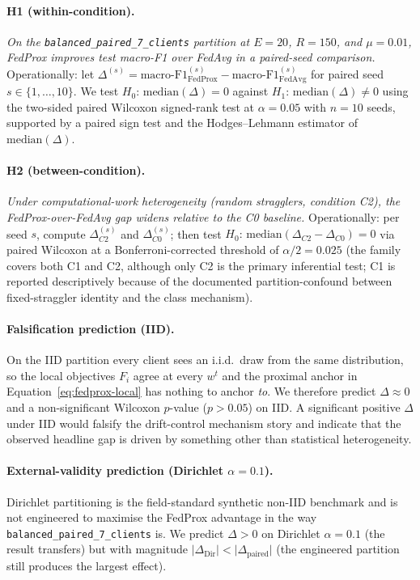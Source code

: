 \documentclass[11pt,a4paper]{article}
\begin{document}
\paragraph{H1 (within-condition).}
\emph{On the \texttt{balanced\_paired\_7\_clients} partition at $E=20$,
$R=150$, and $\mu=0.01$, FedProx improves test macro-F1 over FedAvg in a
paired-seed comparison.} Operationally: let
$\Delta^{(s)} = \mathrm{macro\text{-}F1}_{\mathrm{FedProx}}^{(s)} - \mathrm{macro\text{-}F1}_{\mathrm{FedAvg}}^{(s)}$
for paired seed $s \in \{1,\dots,10\}$. We test
$H_0\!:\, \mathrm{median}(\Delta) = 0$ against
$H_1\!:\, \mathrm{median}(\Delta) \ne 0$ using the two-sided paired Wilcoxon
signed-rank test at $\alpha = 0.05$ with $n = 10$ seeds, supported by a paired
sign test and the Hodges--Lehmann estimator of $\mathrm{median}(\Delta)$.

\paragraph{H2 (between-condition).}
\emph{Under computational-work heterogeneity (random stragglers, condition
C2), the FedProx-over-FedAvg gap widens relative to the C0 baseline.}
Operationally: per seed $s$, compute $\Delta_{C2}^{(s)}$ and
$\Delta_{C0}^{(s)}$; then test
$H_0\!:\, \mathrm{median}(\Delta_{C2} - \Delta_{C0}) = 0$ via paired Wilcoxon
at a Bonferroni-corrected threshold of $\alpha/2 = 0.025$ (the family covers
both C1 and C2, although only C2 is the primary inferential test; C1 is
reported descriptively because of the documented partition-confound between
fixed-straggler identity and the class mechanism).

\paragraph{Falsification prediction (IID).}
On the IID partition every client sees an i.i.d.\ draw from the same
distribution, so the local objectives $F_i$ agree at every $w^t$ and the
proximal anchor in Equation~\ref{eq:fedprox-local} has nothing to anchor
\emph{to}. We therefore predict $\Delta \approx 0$ and a non-significant
Wilcoxon $p$-value ($p > 0.05$) on IID. A significant positive $\Delta$ under
IID would falsify the drift-control mechanism story and indicate that the
observed headline gap is driven by something other than statistical
heterogeneity.

\paragraph{External-validity prediction (Dirichlet $\alpha = 0.1$).}
Dirichlet partitioning \citep{hsu2019dirichlet} is the field-standard
synthetic non-IID benchmark and is not engineered to maximise the FedProx
advantage in the way \texttt{balanced\_paired\_7\_clients} is. We predict
$\Delta > 0$ on Dirichlet $\alpha = 0.1$ (the result transfers) but with
magnitude $\lvert\Delta_{\mathrm{Dir}}\rvert < \lvert\Delta_{\mathrm{paired}}\rvert$
(the engineered partition still produces the largest effect).
\end{document}
